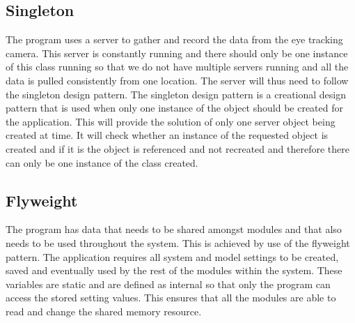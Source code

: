 \subsection{Singleton}
The program uses a server to gather and record the data from the eye tracking camera. This server is constantly running and there should only be one instance of this class running so that we do not have multiple servers running and all the data is pulled consistently from one location. The server will thus need to follow the singleton design pattern. The singleton design pattern is a creational design pattern that is used when only one instance of the object should be created for the application. This will provide the solution of only one server object being created at time. It will check whether an instance of the requested object is created and if it is the object is referenced and not recreated and therefore there can only be one instance of the class created.



%

\subsection{Flyweight}
The program has data that needs to be shared amongst modules and that also needs to be used throughout the system. This is achieved by use of the flyweight pattern. The application requires all system and model settings to be created, saved and eventually used by the rest of the modules within the system. These variables are static and are defined as internal so that only the program can access the stored setting values. This ensures that all the modules are able to read and change the shared memory resource.


